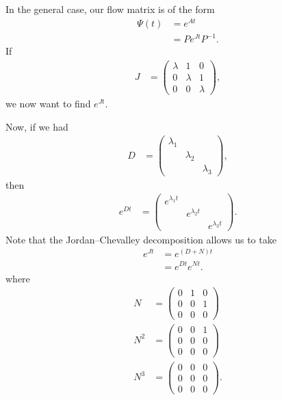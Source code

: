 \documentclass[10pt]{mypackage}
\begin{document}
\begin{example}
  In the general case, our flow matrix is of the form
  \begin{align*}
    \Psi\left( t \right) &= e^{At}\\
                         &= Pe^{Jt}P^{-1}.
  \end{align*}
  If
  \begin{align*}
    J &= \begin{pmatrix}\lambda & 1  & 0 \\ 0 & \lambda & 1 \\ 0 & 0 & \lambda\end{pmatrix},
  \end{align*}
  we now want to find $e^{Jt}$.\newline

  Now, if we had
  \begin{align*}
    D &= \begin{pmatrix}\lambda_1 & &  \\ & \lambda_2 & \\ & & \lambda_3\end{pmatrix},
  \end{align*}
  then
  \begin{align*}
    e^{Dt} &= \begin{pmatrix}e^{\lambda_1t} & & \\ & e^{\lambda_2t} & \\ & & e^{\lambda_3t}\end{pmatrix}.
  \end{align*}
  Note that the Jordan--Chevalley decomposition allows us to take
  \begin{align*}
    e^{Jt} &= e^{\left( D + N \right)t}\\
           &= e^{Dt}e^{Nt}.
  \end{align*}
  where
  \begin{align*}
    N &= \begin{pmatrix}0 & 1 & 0 \\ 0 & 0 & 1 \\ 0 & 0 & 0\end{pmatrix}\\
    N^{2} &= \begin{pmatrix}0 & 0 & 1 \\ 0 & 0 & 0 \\ 0 & 0 & 0\end{pmatrix}\\
    N^3 &= \begin{pmatrix}0 & 0 & 0 \\ 0 & 0 & 0 \\ 0 & 0 & 0\end{pmatrix}.

\end{align*}
\end{example}
\end{document}
